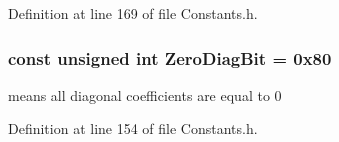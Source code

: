 Definition at line 169 of file Constants.\-h.

\hypertarget{group__flags_gab59e11ef20fc97c063991fc318d2d074}{
\subsubsection[{Zero\-Diag\-Bit}]{\setlength{\rightskip}{0pt plus 5cm}const unsigned {\bf int} Zero\-Diag\-Bit = 0x80}}\label{group__flags_gab59e11ef20fc97c063991fc318d2d074}
means all diagonal coefficients are equal to 0 

Definition at line 154 of file Constants.\-h.

